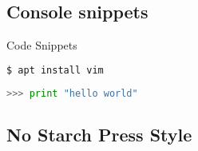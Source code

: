 \documentclass[aspectratio=169,dracula,Frankfurt, 90pt]{darkbeamer}
\begin{document}
\subsection{Console snippets}

\begin{frame}[fragile]{Code Snippets}
\begin{lstlisting}[language=bash, caption=Debian snippet]
$ apt install vim 
\end{lstlisting}

\begin{lstlisting}[language=python, caption=Python snippet]
>>> print "hello world"
\end{lstlisting}
\end{frame}

\subsection{No Starch Press Style}
\end{document}
